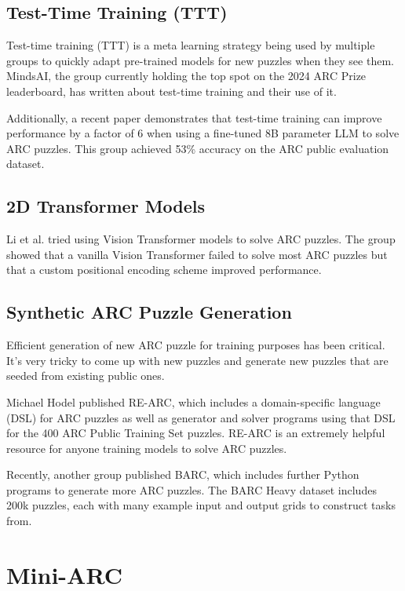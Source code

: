 \documentclass[10pt,twocolumn]{article}
\begin{document}
\subsection{Test-Time Training (TTT)}
Test-time training (TTT) is a meta learning strategy being used by
multiple groups to quickly adapt pre-trained models for new puzzles
when they see them. MindsAI, the group currently holding the top spot
on the 2024 ARC
Prize leaderboard, has written about test-time
training\cite{mindsai} and their use of it.

Additionally, a recent paper\cite{ttt} demonstrates that test-time
training can improve performance by a factor of 6 when using a
fine-tuned 8B parameter LLM to solve ARC puzzles. This group achieved
53\% accuracy on the ARC public evaluation dataset.

\subsection{2D Transformer Models}
Li et al.\cite{li2024tacklingabstractionreasoningcorpus} tried
using Vision Transformer models to solve ARC puzzles. The group
showed that a vanilla Vision Transformer failed to solve most ARC
puzzles but that a custom positional encoding scheme improved performance.

\subsection{Synthetic ARC Puzzle Generation}
Efficient generation of new ARC puzzle for training purposes has been
critical. It's very tricky to come up with new puzzles and generate
new puzzles that are seeded from existing public ones.

Michael Hodel published RE-ARC\cite{rearc}, which includes a
domain-specific language (DSL) for ARC puzzles as well as generator
and solver programs using that DSL for the 400 ARC Public Training Set puzzles.
RE-ARC is an extremely helpful resource for anyone training models to
solve ARC puzzles.

Recently, another group published BARC\cite{barc}, which includes
further Python programs to generate more ARC puzzles. The BARC Heavy
dataset \cite{barcheavy} includes 200k puzzles, each with many example
input and output grids to construct tasks from.

\section{Mini-ARC}
\end{document}
